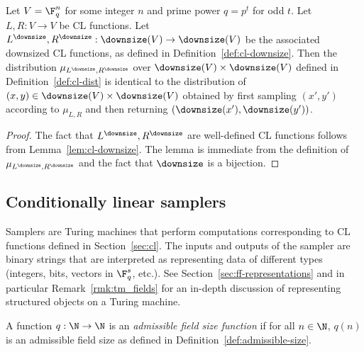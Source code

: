 \begin{lemma}\label{lem:downsize-cl-dist}
  Let $V = \F_q^n$ for some integer $n$ and prime power $q=p^t$ for odd $t$.
  Let $L,R : V\to V$ be CL functions.
  Let $L^\downsize, R^\downsize : \downsize(V)\to \downsize(V)$ be the
  associated downsized CL functions, as defined in
  Definition~\ref{def:cl-downsize}.
  Then the distribution $\mu_{L^\downsize,R^\downsize}$ over $\downsize(V)\times
  \downsize(V)$ defined in Definition~\ref{def:cl-dist} is identical to the
  distribution of $(x,y) \in \downsize(V)\times \downsize(V)$ obtained by first
  sampling $(x',y')$ according to $\mu_{L,R}$ and then returning
  $(\downsize(x'),\downsize(y'))$.
\end{lemma}

\begin{proof}
  The fact that $L^\downsize, R^\downsize$ are well-defined CL functions follows
  from Lemma~\ref{lem:cl-downsize}.
  The lemma is immediate from the definition of $\mu_{L^\downsize,R^\downsize}$
  and the fact that $\downsize$ is a bijection.
\end{proof}

\subsection{Conditionally linear samplers}
\label{sec:cls}

Samplers are Turing machines that perform computations corresponding to CL
functions defined in Section~\ref{sec:cl}.
The inputs and outputs of the sampler are binary strings that are interpreted as
representing data of different types (integers, bits, vectors in $\F_q^s$,
etc.).
See Section~\ref{sec:ff-representations} and in particular
Remark~\ref{rmk:tm_fields} for an in-depth discussion of representing structured
objects on a Turing machine.

\begin{definition}
	A function $q: \N \to \N$ is an \emph{admissible field size function} if for
  all $n \in \N$, $q(n)$ is an admissible field size as defined in
  Definition~\ref{def:admissible-size}.
\end{definition}



